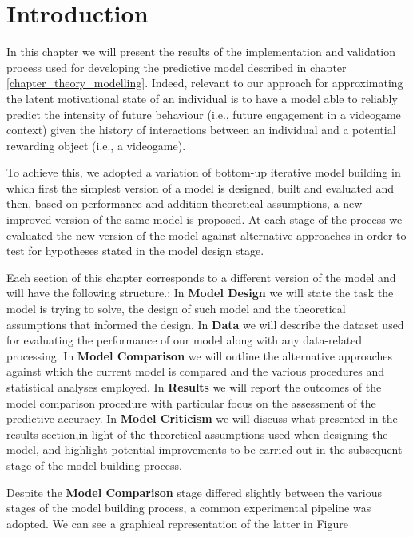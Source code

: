 \section{Introduction}
\label{implementation_testing_introduction}
In this chapter we will present the results of the implementation and validation process used for developing the predictive model described in chapter \ref{chapter_theory_modelling}. Indeed, relevant to our approach for approximating the latent motivational state of an individual is to have a model able to reliably predict the intensity of future behaviour (i.e., future engagement in a videogame context) given the history of interactions between an individual and a potential rewarding object (i.e., a videogame). 

To achieve this, we adopted a variation of bottom-up iterative model building \cite{gelman2020bayesian} in which first the simplest version of a model is designed, built and evaluated and then, based on performance and addition theoretical assumptions, a new improved version of the same model is proposed. At each stage of the process we evaluated the new version of the model against alternative approaches in order to test for hypotheses stated in the model design stage. 

Each section of this chapter corresponds to a different version of the model and will have the following structure.: In \textbf{Model Design} we will state the task the model is trying to solve, the design of such model and the theoretical assumptions that informed the design. In \textbf{Data} we will describe the dataset used for evaluating the performance of our model along with any data-related processing. In \textbf{Model Comparison} we will outline the alternative approaches against which the current model is compared and the various procedures and statistical analyses employed. In \textbf{Results} we will report the outcomes of the model comparison procedure with particular focus on the assessment of the predictive accuracy. In \textbf{Model Criticism} we will discuss what presented in the results section,in light of the theoretical assumptions used when designing the model, and highlight potential improvements to be carried out in the subsequent stage of the model building process. 

Despite the \textbf{Model Comparison} stage differed slightly between the various stages of the model building process, a common experimental pipeline was adopted. We can see a graphical representation of the latter in Figure 

